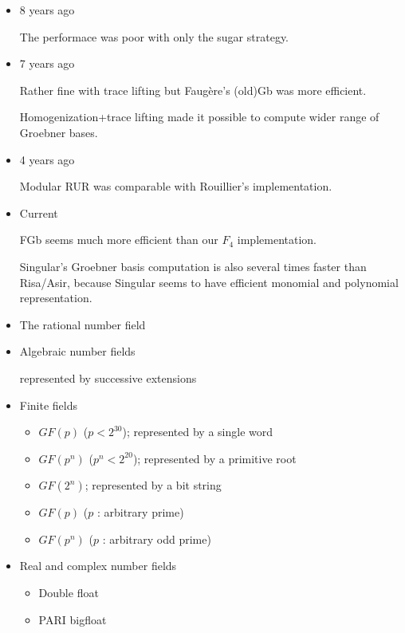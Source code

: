 \begin{slide}{}

\begin{itemize}
\item 8 years ago

The performace was poor with only the sugar strategy.

\item 7 years ago

Rather fine with trace lifting but Faug\`ere's (old)Gb was more
efficient.  

Homogenization+trace lifting made it possible to compute
wider range of Groebner bases.

\item 4 years ago

Modular RUR was comparable with Rouillier's implementation.

\item Current

FGb seems much more efficient than our $F_4$ implementation.

Singular's Groebner basis computation is also several times
faster than Risa/Asir, because Singular seems to have efficient
monomial and polynomial representation.

\end{itemize}
\end{slide}

\begin{slide}{}

\begin{itemize}
\item The rational number field
\item Algebraic number fields

represented by successive extensions
\item Finite fields
\begin{itemize}
\item $GF(p)$ ($p<2^{30}$); represented by a single word
\item $GF(p^n)$ ($p^n < 2^{20}$); represented by a primitive root
\item $GF(2^n)$; represented by a bit string
\item $GF(p)$ ($p$ : arbitrary prime)
\item $GF(p^n)$ ($p$ : arbitrary odd prime)
\end{itemize}

\item Real and complex number fields

\begin{itemize}
\item Double float
\item PARI bigfloat
\end{itemize}

\end{itemize}
\end{slide}


